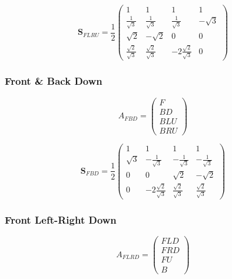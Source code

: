 \documentclass[12pt]{article}
\begin{document}
\begin{equation}	\label{eq:ab_flru}
\mathbf{S}_{FLRU} = \frac{1}{2} \begin{pmatrix}
	1 & 1 & 1 & 1\\
	\frac{1}{\sqrt{3}} & \frac{1}{\sqrt{3}} & \frac{1}{\sqrt{3}} & -\sqrt{3}\\
	\sqrt{2} & -\sqrt{2} & 0 & 0\\
	\frac{\sqrt{2}}{\sqrt{3}} & \frac{\sqrt{2}}{\sqrt{3}} & -2\frac{\sqrt{2}}{\sqrt{3}} & 0 
\end{pmatrix}
\end{equation}


\subsubsection{Front \& Back Down}

\begin{equation}	\label{eq:afbd_sig}
A_{FBD} = \begin{pmatrix}
	F\\
	BD\\
	BLU\\
	BRU
\end{pmatrix}
\end{equation}


\begin{equation}	\label{eq:ab_fbd}
\mathbf{S}_{FBD} = \frac{1}{2} \begin{pmatrix}
	1 & 1 & 1 & 1\\
	\sqrt{3} & -\frac{1}{\sqrt{3}} & -\frac{1}{\sqrt{3}} & -\frac{1}{\sqrt{3}}\\
	0 & 0 & \sqrt{2} & -\sqrt{2}\\
	0 & -2\frac{\sqrt{2}}{\sqrt{3}} & \frac{\sqrt{2}}{\sqrt{3}} & \frac{\sqrt{2}}{\sqrt{3}}
\end{pmatrix}
\end{equation}

\subsubsection{Front Left-Right Down}

\begin{equation}	\label{eq:aflrd_sig}
A_{FLRD} = \begin{pmatrix}
	FLD\\
	FRD\\
	FU\\
	B
\end{pmatrix}
\end{equation}
\end{document}
